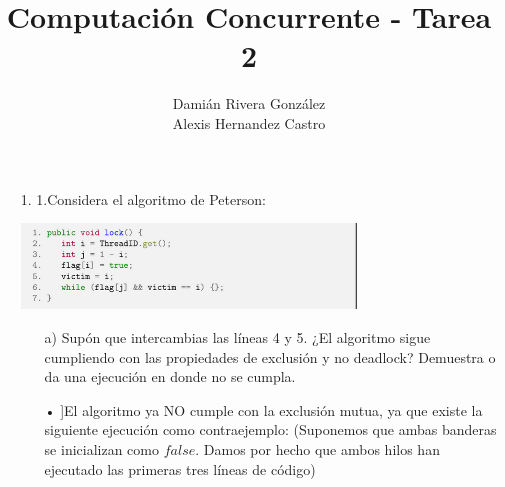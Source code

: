 \documentclass[12pt, letterpaper]{article}
\title{Computación Concurrente - Tarea 2}
\author{Damián Rivera González\\Alexis Hernandez Castro}
\begin{document}
\maketitle


\begin{itemize}
\item[1. ] 1.Considera el algoritmo de Peterson:\\

\begin{center}
\includegraphics[width=0.7\textwidth]{pettersonCode.png}\\
\end{center}
\begin{itemize}

\item[a) ] Sup\'on que intercambias las l\'ineas 4 y 5. ¿El algoritmo sigue cumpliendo
con las propiedades de exclusi\'on y no deadlock? Demuestra o da una
ejecuci\'on en donde no se cumpla.

\item[•]]El algoritmo ya NO cumple con la exclusión mutua, ya que existe la siguiente ejecución como contraejemplo:
(Suponemos que ambas banderas se inicializan como $false$. Damos por hecho que ambos hilos han ejecutado las primeras tres líneas de código)

\\


\end{itemize}
\end{itemize}
\end{document}
